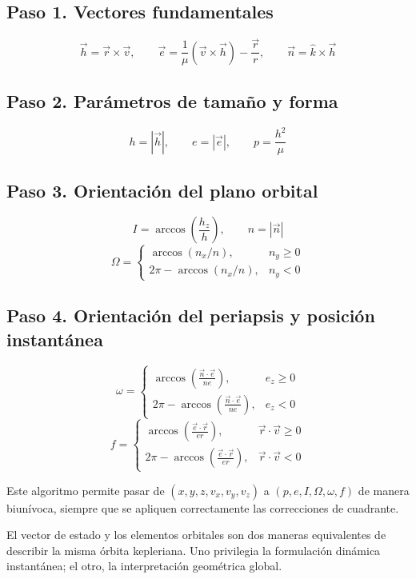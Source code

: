 \subsection{Paso 1. Vectores fundamentales}
\[
\vec{h} = \vec{r} \times \vec{v}, \qquad
\vec{e} = \frac{1}{\mu}(\vec{v} \times \vec{h}) - \frac{\vec{r}}{r}, \qquad
\vec{n} = \hat{k} \times \vec{h}
\]

\subsection{Paso 2. Parámetros de tamaño y forma}
\[
 h = |\vec{h}|, \qquad e = |\vec{e}|, \qquad p = \frac{h^2}{\mu}
\]

\subsection{Paso 3. Orientación del plano orbital}
\[
 I = \arccos\left(\frac{h_z}{h}\right), \qquad n = |\vec{n}|
\]
\[
\Omega =
\begin{cases}
\arccos(n_x/n), & n_y \ge 0 \\
2\pi - \arccos(n_x/n), & n_y < 0
\end{cases}
\]

\subsection{Paso 4. Orientación del periapsis y posición instantánea}
\[
\omega =
\begin{cases}
\arccos\left(\frac{\vec{n}\cdot\vec{e}}{ne}\right), & e_z \ge 0 \\
2\pi - \arccos\left(\frac{\vec{n}\cdot\vec{e}}{ne}\right), & e_z < 0
\end{cases}
\]
\[
 f =
\begin{cases}
\arccos\left(\frac{\vec{e}\cdot\vec{r}}{er}\right), & \vec{r}\cdot\vec{v} \ge 0 \\
2\pi - \arccos\left(\frac{\vec{e}\cdot\vec{r}}{er}\right), & \vec{r}\cdot\vec{v} < 0
\end{cases}
\]

Este algoritmo permite pasar de \((x,y,z,v_x,v_y,v_z)\) a \((p,e,I,\Omega,\omega,f)\) de manera biunívoca, siempre que se apliquen correctamente las correcciones de cuadrante.

\begin{importante}
El vector de estado y los elementos orbitales son dos maneras equivalentes de describir la misma órbita kepleriana. Uno privilegia la formulación dinámica instantánea; el otro, la interpretación geométrica global.
\end{importante}

